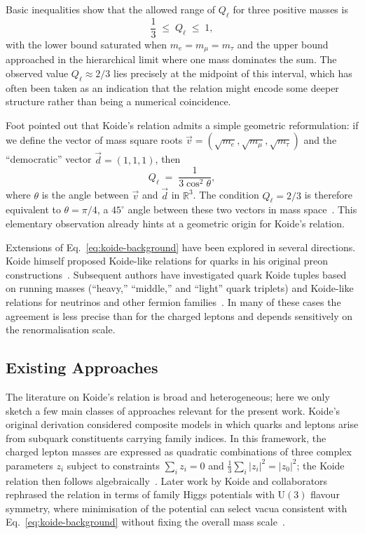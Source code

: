 \documentclass[12pt]{article}
\begin{document}
Basic inequalities show that the allowed range of $Q_\ell$ for three positive
masses is
\begin{equation}
  \frac{1}{3} \;\leq\; Q_\ell \;\leq\; 1,
\end{equation}
with the lower bound saturated when $m_e = m_\mu = m_\tau$ and the upper bound
approached in the hierarchical limit where one mass dominates the sum.  The
observed value $Q_\ell \approx 2/3$ lies precisely at the midpoint of this
interval, which has often been taken as an indication that the relation might
encode some deeper structure rather than being a numerical coincidence.

Foot pointed out that Koide's relation admits a simple geometric reformulation:
if we define the vector of mass square roots
$\vec{v} = (\sqrt{m_e},\sqrt{m_\mu},\sqrt{m_\tau})$ and the ``democratic''
vector $\vec{d} = (1,1,1)$, then
\begin{equation}
  Q_\ell \;=\; \frac{1}{3 \cos^2\theta},
\end{equation}
where $\theta$ is the angle between $\vec{v}$ and $\vec{d}$ in $\mathbb{R}^3$.
The condition $Q_\ell = 2/3$ is therefore equivalent to
$\theta = \pi/4$, a $45^\circ$ angle between these two vectors
in mass space~\cite{Foot1994}.  This elementary observation already hints at a
geometric origin for Koide's relation.

Extensions of Eq.~\eqref{eq:koide-background} have been explored in several
directions.  Koide himself proposed Koide-like relations for quarks in his
original preon constructions~\cite{Koide1981,Koide1983}.  Subsequent authors
have investigated quark Koide tuples based on running masses
(``heavy,'' ``middle,'' and ``light'' quark triplets) and Koide-like relations
for neutrinos and other fermion families~\cite{Kartavtsev2006,RodejohannZhang2011,Cao2012,RiveroKoideReview}.  In many of
these cases the agreement is less precise than for the charged leptons and
depends sensitively on the renormalisation scale.

\subsection{Existing Approaches}

The literature on Koide's relation is broad and heterogeneous; here we only
sketch a few main classes of approaches relevant for the present work.
Koide's original derivation considered composite models in which quarks and
leptons arise from subquark constituents carrying family indices.  In this
framework, the charged lepton masses are expressed as quadratic combinations of
three complex parameters $z_i$ subject to constraints
$\sum_i z_i = 0$ and $\tfrac{1}{3}\sum_i |z_i|^2 = |z_0|^2$; the Koide
relation then follows algebraically~\cite{Koide1983}.  Later work by Koide and
collaborators rephrased the relation in terms of family Higgs potentials with
$\mathrm{U}(3)$ flavour symmetry, where minimisation of the potential can
select vacua consistent with Eq.~\eqref{eq:koide-background}
without fixing the overall mass scale~\cite{Koide1993,KoideFamilyHiggs}.
\end{document}
